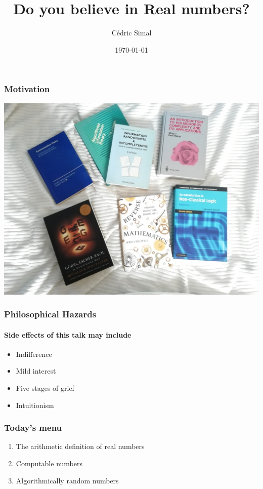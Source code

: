 \documentclass{beamer}
\author{Cédric Simal}
\date{\today}
\title{Do you believe in Real numbers?}
\begin{document}
\frame{\titlepage}

\begin{frame}
\frametitle{Motivation}
\begin{center}
    \includegraphics[width=.9\textwidth]{images/books.jpg}
\end{center}
\end{frame}

\begin{frame}
\frametitle{Philosophical Hazards}
\framesubtitle{Side effects of this talk may include}
\begin{itemize}
    \item Indifference
    \item Mild interest
    \item Five stages of grief
    \item Intuitionism
\end{itemize}

\end{frame}

\begin{frame}
    \frametitle{Today's menu}
    \begin{enumerate}
        \item The arithmetic definition of real numbers
        \item Computable numbers
        \item Algorithmically random numbers
    \end{enumerate}
\end{frame}
\end{document}
